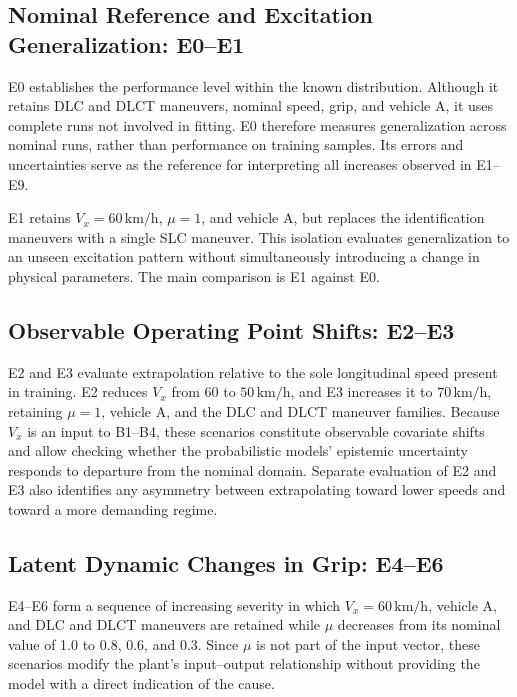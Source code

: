 \documentclass[12pt,a4paper]{report}
\begin{document}
\subsection{Nominal Reference and Excitation Generalization: E0--E1}

E0 establishes the performance level within the known distribution. Although it retains DLC and DLCT maneuvers, nominal speed, grip, and vehicle A, it uses complete runs not involved in fitting. E0 therefore measures generalization across nominal runs, rather than performance on training samples. Its errors and uncertainties serve as the reference for interpreting all increases observed in E1--E9.

E1 retains $V_x=60\,\mathrm{km/h}$, $\mu=1$, and vehicle A, but replaces the identification maneuvers with a single SLC maneuver. This isolation evaluates generalization to an unseen excitation pattern without simultaneously introducing a change in physical parameters. The main comparison is E1 against E0.

\subsection{Observable Operating Point Shifts: E2--E3}

E2 and E3 evaluate extrapolation relative to the sole longitudinal speed present in training. E2 reduces $V_x$ from 60 to $50\,\mathrm{km/h}$, and E3 increases it to $70\,\mathrm{km/h}$, retaining $\mu=1$, vehicle A, and the DLC and DLCT maneuver families. Because $V_x$ is an input to B1--B4, these scenarios constitute observable covariate shifts and allow checking whether the probabilistic models' epistemic uncertainty responds to departure from the nominal domain. Separate evaluation of E2 and E3 also identifies any asymmetry between extrapolating toward lower speeds and toward a more demanding regime.

\subsection{Latent Dynamic Changes in Grip: E4--E6}

E4--E6 form a sequence of increasing severity in which $V_x=60\,\mathrm{km/h}$, vehicle A, and DLC and DLCT maneuvers are retained while $\mu$ decreases from its nominal value of 1.0 to 0.8, 0.6, and 0.3. Since $\mu$ is not part of the input vector, these scenarios modify the plant's input--output relationship without providing the model with a direct indication of the cause.
\end{document}
